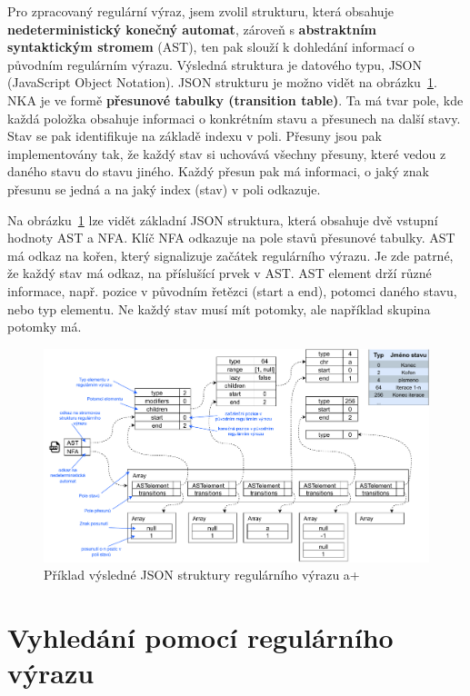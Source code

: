 Pro zpracovaný regulární výraz, jsem zvolil strukturu, která obsahuje \textbf{nedeterministický konečný automat}, zároveň s \textbf{abstraktním syntaktickým stromem} (AST), 
ten pak slouží k dohledání informací o původním regulárním výrazu. 
Výsledná struktura je datového typu, JSON (JavaScript Object Notation).
JSON strukturu je možno vidět na obrázku~\ref{fig:JSONex}.
NKA je ve formě \textbf{přesunové tabulky (transition table)}. 
Ta má tvar pole, kde každá položka obsahuje informaci o konkrétním stavu a přesunech na další stavy.
Stav se pak identifikuje na základě indexu v poli. 
Přesuny jsou pak implementovány tak, že každý stav si uchovává všechny přesuny, které vedou z daného stavu do stavu jiného.
Každý přesun pak má informaci, o jaký znak přesunu se jedná a na jaký index (stav) v poli odkazuje. 

Na obrázku~\ref{fig:JSONex} lze vidět základní JSON struktura, která obsahuje dvě vstupní hodnoty AST a NFA.
Klíč NFA odkazuje na pole stavů přesunové tabulky. 
AST má odkaz na kořen, který signalizuje začátek regulárního výrazu.
Je zde patrné, že každý stav má odkaz, na příslušící prvek v AST. 
AST element drží různé informace, např. pozice v původním řetězci (start a end), 
potomci daného stavu, nebo typ elementu. 
Ne každý stav musí mít potomky, ale například skupina potomky má.

\begin{figure}[!h]
	\centering
	\includegraphics[width=1\textwidth]{Figures/BP-JSON.pdf}
	\caption{Příklad výsledné JSON struktury regulárního výrazu a+}
	\label{fig:JSONex}
\end{figure}

\section{Vyhledání pomocí regulárního výrazu}\label{sec:PatternMatching}

